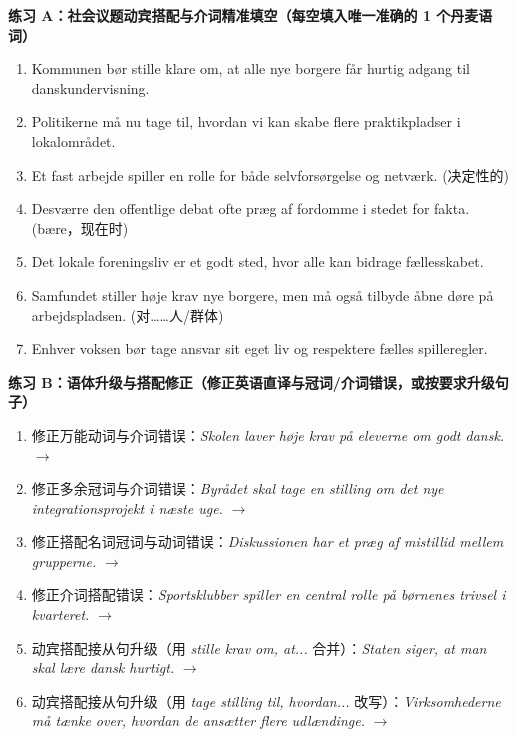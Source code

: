 \textbf{练习 A：社会议题动宾搭配与介词精准填空（每空填入唯一准确的 1 个丹麦语词）}
\begin{enumerate}
  \item Kommunen bør stille klare \underline{\hspace{2.2cm}} om, at alle nye borgere får hurtig adgang til danskundervisning.
  \item Politikerne må nu tage \underline{\hspace{2.2cm}} til, hvordan vi kan skabe flere praktikpladser i lokalområdet.
  \item Et fast arbejde spiller en \underline{\hspace{2.2cm}} rolle for både selvforsørgelse og netværk. (决定性的)
  \item Desværre \underline{\hspace{2.2cm}} den offentlige debat ofte præg af fordomme i stedet for fakta. (bære，现在时)
  \item Det lokale foreningsliv er et godt sted, hvor alle kan bidrage \underline{\hspace{2.2cm}} fællesskabet.
  \item Samfundet stiller høje krav \underline{\hspace{2.2cm}} nye borgere, men må også tilbyde åbne døre på arbejdspladsen. (对……人/群体)
  \item Enhver voksen bør tage ansvar \underline{\hspace{2.2cm}} sit eget liv og respektere fælles spilleregler.
\end{enumerate}

\textbf{练习 B：语体升级与搭配修正（修正英语直译与冠词/介词错误，或按要求升级句子）}
\begin{enumerate}
  \item 修正万能动词与介词错误：\textit{Skolen laver høje krav på eleverne om godt dansk.} $\rightarrow$
  \item 修正多余冠词与介词错误：\textit{Byrådet skal tage en stilling om det nye integrationsprojekt i næste uge.} $\rightarrow$
  \item 修正搭配名词冠词与动词错误：\textit{Diskussionen har et præg af mistillid mellem grupperne.} $\rightarrow$
  \item 修正介词搭配错误：\textit{Sportsklubber spiller en central rolle på børnenes trivsel i kvarteret.} $\rightarrow$
  \item 动宾搭配接从句升级（用 \textit{stille krav om, at...} 合并）：\textit{Staten siger, at man skal lære dansk hurtigt.} $\rightarrow$
  \item 动宾搭配接从句升级（用 \textit{tage stilling til, hvordan...} 改写）：\textit{Virksomhederne må tænke over, hvordan de ansætter flere udlændinge.} $\rightarrow$
\end{enumerate}

